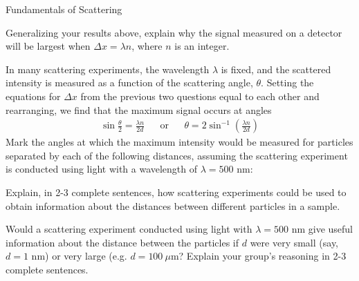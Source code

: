 \begin{activity}{Fundamentals of Scattering}
\begin{ctqs}
	\question Generalizing your results above, explain why the signal measured on a detector will be largest when $\Delta x = \lambda n$, where $n$ is an integer.
	
		\begin{solution}[1.5in]
		\end{solution}
	
	\question In many scattering experiments, the wavelength $\lambda$ is fixed, and the scattered intensity is measured as a function of the scattering angle, $\theta$.  Setting the equations for $\Delta x$ from the previous two questions equal to each other and rearranging, we find that the maximum signal occurs at angles
		\begin{align*}
			\sin \frac{\theta}{2} = \frac{\lambda n}{2d} && \text{or} && \theta = 2\sin^{-1}\left(\frac{\lambda n}{2d}\right)
		\end{align*}
		Mark the angles at which the maximum intensity would be measured for particles separated by each of the following distances, assuming the scattering experiment is conducted using light with a wavelength of $\lambda=500\text{ nm}$:
		
		\begin{solution}[1.5in]\end{solution}
		
	\question Explain, in 2-3 complete sentences, how scattering experiments could be used to obtain information about the distances between different particles in a sample.
	
		\begin{solution}[2in]
		\end{solution}
	
	\question Would a scattering experiment conducted using light with $\lambda=500\text{ nm}$ give useful information about the distance between the particles if $d$ were very small (say, $d=1\text{ nm}$) or very large (e.g. $d=100~\mu\text{m}$?  Explain your group's reasoning in 2-3 complete sentences.
	
		\begin{solution}[2in]
		\end{solution}
	
\end{ctqs}


\begin{infobox}%


\end{infobox}
\end{activity}

